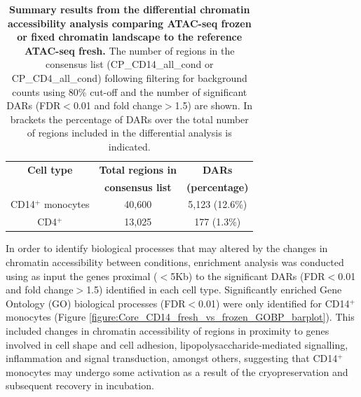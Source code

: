 	
	
\begin{table}[htbp]
\centering
\begin{tabular}{@{} c c c}
\toprule
\textbf{Cell type} & \textbf{Total regions in} & \textbf{DARs} \\
                   & \textbf{consensus list}   & \textbf{(percentage)} \\
\midrule
\midrule
CD14$^+$ monocytes & 40,600                    & 5,123 (12.6\%) \\
CD4$^+$            & 13,025                    & 177  (1.3\%) \\
\bottomrule
\end{tabular}
\medskip %
\caption[Summary results from the differential chromatin accessibility analysis comparing ATAC-seq frozen or fixed chromatin landscape to the reference ATAC-seq fresh.]{\textbf{Summary results from the differential chromatin accessibility analysis comparing ATAC-seq frozen or fixed chromatin landscape to the reference ATAC-seq fresh.} The number of regions in the consensus list (CP\_CD14\_all\_cond or CP\_CD4\_all\_cond) following filtering for background counts using 80\% cut-off and the number of significant DARs (FDR$<$0.01 and fold change$>$1.5) are shown. In brackets the percentage of DARs over the total number of regions included in the differential analysis is indicated.}
\label{tab:Core_ATAC_all_conditions_DARs}
\end{table}
\bigskip %


In order to identify biological processes that may altered by the changes in chromatin accessibility between conditions, enrichment analysis was conducted using as input the genes proximal ($<$5Kb) to the significant DARs (FDR$<$0.01 and fold change$>$1.5) identified in each cell type. Significantly enriched Gene Ontology (GO) biological processes (FDR$<$0.01) were only identified for CD14$^+$ monocytes (Figure \ref{figure:Core_CD14_fresh_vs_frozen_GOBP_barplot}). This included changes in chromatin accessibility of regions in proximity to genes involved in cell shape and cell adhesion, lipopolysaccharide-mediated signalling, inflammation and signal transduction, amongst others, suggesting that CD14$^+$ monocytes may undergo some activation as a result of the cryopreservation and subsequent recovery in incubation. 



